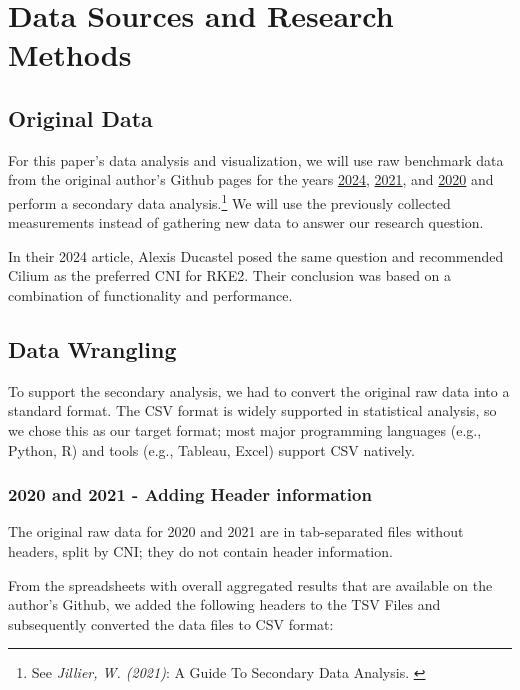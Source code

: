 %
%

\pagebreak
\section{Data Sources and Research Methods}

\onehalfspacing

\subsection{Original Data}

For this paper's data analysis and visualization, we will use raw benchmark data from the original author's Github pages for the years \href{https://github.com/InfraBuilder/benchmark-k8s-cni-2024-01}{2024}, \href{https://github.com/InfraBuilder/benchmark-k8s-cni-2021-05}{2021}, and \href{https://github.com/InfraBuilder/benchmark-k8s-cni-2020-08}{2020} and perform a secondary data analysis.\footnote{See \textit{Jillier, W. (2021)}: A Guide To Secondary Data Analysis. \cite{secondaryDA}} We will use the previously collected measurements instead of gathering new data to answer our research question.

In their 2024 article, Alexis Ducastel posed the same question and recommended Cilium as the preferred CNI for RKE2. Their conclusion was based on a combination of functionality and performance.

\subsection{Data Wrangling}

To support the secondary analysis, we had to convert the original raw data into a standard format. The CSV format is widely supported in statistical analysis, so we chose this as our target format; most major programming languages (e.g., Python, R) and tools (e.g., Tableau, Excel) support CSV natively.

\subsubsection{2020 and 2021 - Adding Header information}

The original raw data for 2020 and 2021 are in tab-separated files without headers, split by CNI; they do not contain header information.

From the spreadsheets with overall aggregated results that are available on the author's Github, we added the following headers to the TSV Files and subsequently converted the data files to CSV format:

